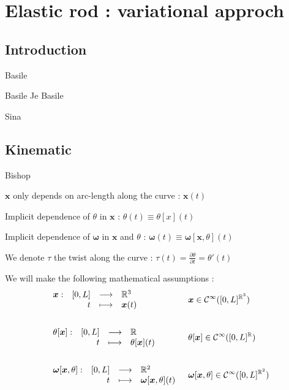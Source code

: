 \chapter{Elastic rod : variational approch}

\section{Introduction}

\lipsum[1]

Basile \cite{Bergou2010}

Basile \cite{Bergou2008}
Je
Basile \cite{Audoly2000}

Sina \cite{Nabei2014}

\section{Kinematic}

Bishop

 $\boldsymbol{x}$ only depends on arc-length along the curve : $\boldsymbol{x}(t)$

Implicit dependence of $\theta$ in $\boldsymbol{x}$ : $\theta(t) \equiv \theta[x](t)$

Implicit dependence of $\boldsymbol{\omega}$ in $\boldsymbol{x}$ and $\theta$ : $\boldsymbol{\omega}(t) \equiv \boldsymbol{\omega}[\boldsymbol{x},\theta](t)$

We denote $\tau$ the twist along the curve : $\tau(t) = \frac{\partial \theta}{\partial t} = \theta'(t)$

We will make the following mathematical assumptions :
\begin{align}
	&\begin{array}{lrcl} \boldsymbol{x}: & [0,L] & \longrightarrow & \mathbb{R}^3 \\ & t & \longmapsto & \boldsymbol{x}(t) \end{array}
	&&\boldsymbol{x} \in \mathcal{C}^{\infty}([0,L]^{\mathbb{R}^3})
	\\ \notag\\
	&\begin{array}{lrcl} \theta[\boldsymbol{x}]: & [0,L] & \longrightarrow & \mathbb{R} \\ & t & \longmapsto & \theta[\boldsymbol{x}](t) \end{array}
	&&\theta[\boldsymbol{x}] \in \mathcal{C}^{\infty}([0,L]^{\mathbb{R}})
	\\ \notag\\
	&\begin{array}{lrcl} \boldsymbol{\omega}[\boldsymbol{x},\theta]: & [0,L] & \longrightarrow & \mathbb{R}^2 \\ & t & \longmapsto & \boldsymbol{\omega}[\boldsymbol{x},\theta](t) \end{array}
	&&\boldsymbol{\omega}[\boldsymbol{x},\theta] \in \mathcal{C}^{\infty}([0,L]^{\mathbb{R}^2})
\end{align}

